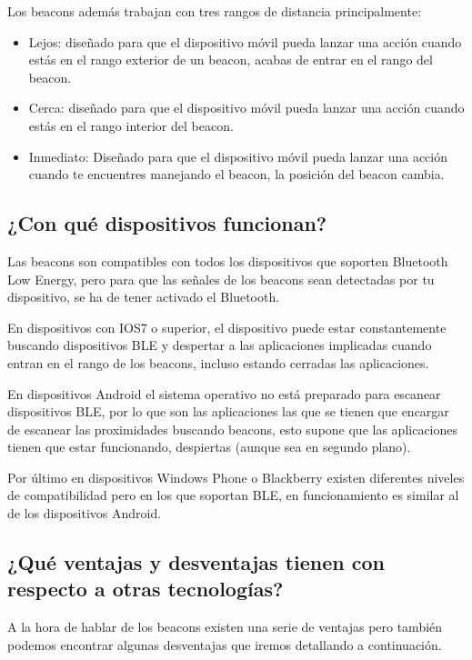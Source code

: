 Los beacons además trabajan con tres rangos de distancia principalmente: 

\begin{itemize}
\item Lejos: diseñado para que el dispositivo móvil pueda lanzar una acción cuando estás en el rango exterior de un beacon, acabas de entrar en el rango del beacon.
\item Cerca: diseñado para que el dispositivo móvil pueda lanzar una acción cuando estás en el rango interior del beacon. 
\item Inmediato: Diseñado para que el dispositivo móvil pueda lanzar una acción cuando te encuentres manejando el beacon, la posición del beacon cambia.
\end{itemize}

\subsection{¿Con qué dispositivos funcionan?}

Las beacons son compatibles con todos los dispositivos que soporten Bluetooth Low Energy, pero para que las señales de los beacons sean detectadas por tu dispositivo, se ha de tener activado el Bluetooth. 


En dispositivos con IOS7 \cite{URL::IOS7} o superior, el dispositivo puede estar constantemente buscando dispositivos BLE y despertar a las aplicaciones implicadas cuando entran en el rango de los beacons, incluso estando cerradas las aplicaciones.


En dispositivos Android \cite{URL::Android} el sistema operativo no está preparado para escanear dispositivos BLE, por lo que son las aplicaciones las que se tienen que encargar de escanear las proximidades buscando beacons, esto supone que las aplicaciones tienen que estar funcionando, despiertas (aunque sea en segundo plano).

Por último en dispositivos Windows Phone \cite{URL:WindowsPhone} o Blackberry \cite{URL:Blackberry} existen diferentes niveles de compatibilidad pero en los que soportan BLE, en funcionamiento es similar al de los dispositivos Android. 

\subsection{¿Qué ventajas y desventajas tienen con respecto a otras tecnologías?}

A la hora de hablar de los beacons existen una serie de ventajas pero también podemos encontrar algunas desventajas que iremos detallando a continuación. 


